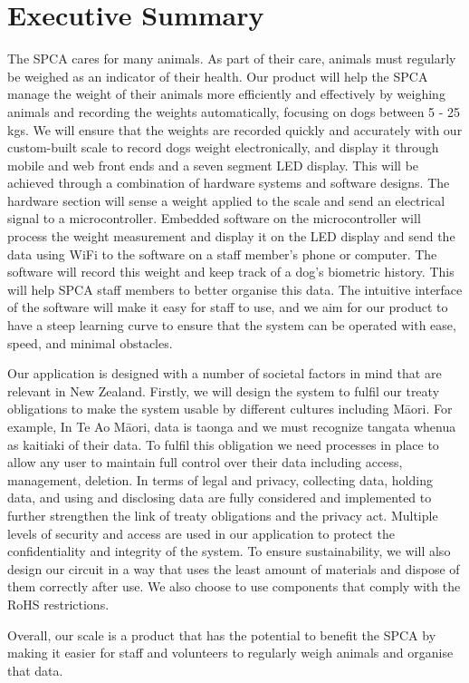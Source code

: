 
\chapter{Executive Summary}

The SPCA cares for many animals. As part of their care, animals must regularly be weighed as an indicator of their health. Our product will help the SPCA manage the weight of their animals more efficiently and effectively by weighing animals and recording the weights automatically, focusing on dogs between 5 - 25 kgs. We will ensure that the weights are recorded quickly and accurately with our custom-built scale to record dogs weight electronically, and display it through mobile and web front ends and a seven segment LED display. This will be achieved through a combination of hardware systems and software designs. The hardware section will sense a weight applied to the scale and send an electrical signal to a microcontroller. Embedded software on the microcontroller will process the weight measurement and display it on the LED display and send the data using WiFi to the software on a staff member’s phone or computer. The software will record this weight and keep track of a dog’s biometric history. This will help SPCA staff members to better organise this data. The intuitive interface of the software will make it easy for staff to use, and we aim for our product to have a steep learning curve to ensure that the system can be operated with ease, speed, and minimal obstacles.

Our application is designed with a number of societal factors in mind that are relevant in New Zealand. Firstly, we will design the system to fulfil our treaty obligations to make the system usable by different cultures including Māori. For example, In Te Ao Māori, data is taonga and we must recognize tangata whenua as kaitiaki of their data. To fulfil this obligation we need processes in place to allow any user to maintain full control over their data including access, management, deletion. In terms of legal and privacy, collecting data, holding data, and using and disclosing data are fully considered and implemented to further strengthen the link of treaty obligations and the privacy act. Multiple levels of security and access are used in our application to protect the confidentiality and integrity of the system. To ensure sustainability, we will also design our circuit in a way that uses the least amount of materials and dispose of them correctly after use. We also choose to use components that comply with the RoHS restrictions.

Overall, our scale is a product that has the potential to benefit the SPCA by making it easier  for staff and volunteers to regularly weigh animals and organise that data. 
